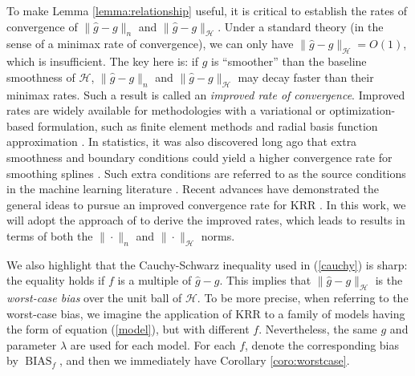 \documentclass[12pt]{article}
\theoremstyle{plain}
\theoremstyle{remark}
\begin{document}
To make Lemma \ref{lemma:relationship} useful, it is critical to establish the rates of convergence of $\|\hat{g}-g\|_n$ and $\|\hat{g}-g\|_{\mathcal{H}}$. Under a standard theory (in the sense of a minimax rate of convergence), we can only have $\|\hat{g}-g\|_{\mathcal{H}}=O(1)$, which is insufficient. The key here is: if $g$ is ``smoother'' than the baseline smoothness of $\mathcal{H}$, $\|\hat{g}-g\|_n$ and $\|\hat{g}-g\|_{\mathcal{H}}$ may decay faster than their minimax rates. Such a result is called an \textit{improved rate of convergence}. Improved rates are widely available for methodologies with a variational or optimization-based formulation, such as finite element methods \citep{brenner2008mathematical} and radial basis function approximation \citep{wendland2004scattered}. In statistics, it was also discovered long ago that extra smoothness and boundary conditions could yield a higher convergence rate for smoothing splines \citep{wahba1975periodic}. Such extra conditions are referred to as the source conditions in the machine learning literature \cite{bauer2007regularization,li2022saturation,rastogi2017optimal}. Recent advances have demonstrated the general ideas to pursue an improved convergence rate for KRR \citep{dicker2017kernel,fischer2020sobolev,guo2017learning,lin2017distributed,tuo2020improved}. 
In this work, we will adopt the approach of \cite{tuo2020improved} to derive the improved rates, which leads to results in terms of both the $\|\cdot\|_n$ and $\|\cdot\|_{\mathcal{H}}$ norms. 


We also highlight that the Cauchy-Schwarz inequality used in (\ref{cauchy}) is sharp: the equality holds if $f$ is a multiple of $\hat{g}-g$. This implies that $\|\hat{g}-g\|_\mathcal{H}$ is the \textit{worst-case bias} over the unit ball of $\mathcal{H}$. To be more precise, when referring to the worst-case bias, we imagine the application of KRR to a family of
models having the form of equation (\ref{model}), but with different $f$. Nevertheless, the same $g$ and parameter $\lambda$ are used for each model. For each $f$, denote the corresponding bias by $\operatorname{BIAS}_f$, and then we immediately have Corollary \ref{coro:worstcase}. 
\end{document}
